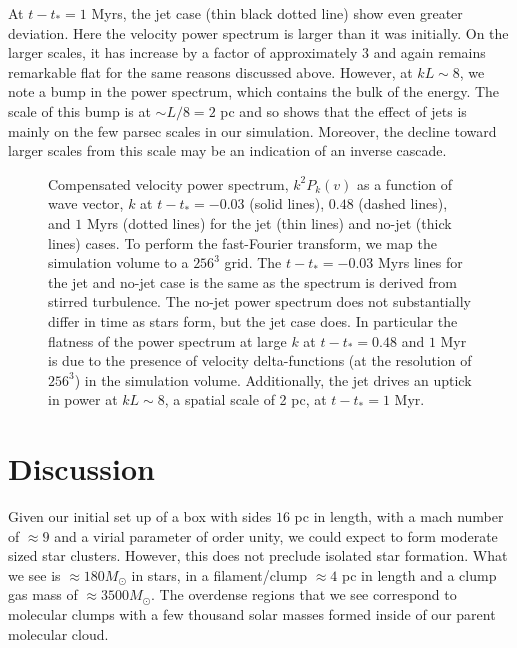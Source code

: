 \documentclass[../dissertation.tex]{subfiles}
\begin{document}
At $t-t_* = 1$ Myrs, the jet case (thin black dotted line) show even greater deviation.  Here the velocity power spectrum is larger than it was initially.  On the larger scales, it has increase by a factor of approximately 3 and again remains remarkable flat for the same reasons discussed above.  However, at $kL\sim 8$, we note a bump in the power spectrum, which contains the bulk of the energy.  The scale of this bump is at $\sim L/8 = 2$ pc and so shows that the effect of jets is mainly on the few parsec scales in our simulation.  Moreover, the decline toward larger scales from this scale may be an indication of an inverse cascade.
%
\begin{figure}[htb] %
  \caption[Jet - Velocity Power Spectrum]{Compensated velocity power spectrum, $k^2P_k(v)$ as a function of wave vector, $k$ at $t-t_* = -0.03$ (solid lines), $0.48$ (dashed lines), and $1$ Myrs (dotted lines) for the jet (thin lines) and no-jet (thick lines) cases.  To perform the fast-Fourier transform, we map the simulation volume to a $256^3$ grid.  The $t-t_* = -0.03$ Myrs lines for the jet and no-jet case is the same as the spectrum is derived from stirred turbulence.  The no-jet power spectrum does not substantially differ in time as stars form, but the jet case does. In particular the flatness of the power spectrum at large $k$ at $t-t_*=0.48$ and $1$ Myr is due to the presence of velocity delta-functions (at the resolution of $256^3$) in the simulation volume.  Additionally, the jet drives an uptick in power at $kL\sim 8$, a spatial scale of 2 pc, at $t-t_*=1$ Myr.
}
    \label{fig:jet_power_spectrum}
\end{figure}
%


\section{Discussion}\label{sec:jet_discussion}


Given our initial set up of a box with sides $16$ pc in length, with a mach number of $\approx 9$ and a virial parameter of order unity, we could expect to form moderate sized star clusters. However, this does not preclude isolated star formation.
What we see is $\approx 180 M_\odot $ in stars, in a filament/clump $\approx 4$ pc in length and a clump gas mass of $\approx 3500 M_\odot $. The overdense regions that we see correspond to molecular clumps with a few thousand solar masses formed inside of our parent molecular cloud.
\end{document}

